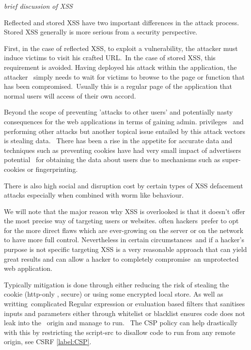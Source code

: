 \documentclass[a4paper,12pt]{paper}
\begin{document}
\emph{brief discussion of XSS}

Reflected and stored XSS have two important differences in the attack process. Stored XSS generally is more serious from a security perspective.

First, in the case of reflected XSS, to exploit a vulnerability, the attacker must induce victims to visit his crafted URL.\
In the case of stored XSS, this requirement is avoided. Having deployed his attack within the application, the attacker \
simply needs to wait for victims to browse to the page or function that has been compromised.\
Usually this is a regular page of the application that normal users will access of their own accord.\

Beyond the scope of preventing 'attacks to other users' and potentially nasty consequences for the web applications in terms of gaining admin. privileges \
and performing other attacks but another topical issue entailed by this attack vectors is stealing data. \
There has been a rise in the appetite for accurate data and techniques such as preventing cookies have had very small impact of advertisers potential \
for obtaining the data about users due to mechanisms such as super-cookies or fingerprinting. \

There is also high social and disruption cost by certain types of XSS defacement attacks especially when combined with worm like behaviour.\

We will note that the major reason why XSS is overlooked is that it doesn't offer the most precise way of targeting users or websites. often hackers\
prefer to opt for the more direct flaws which are ever-growing on the server or on the network to have more full control. Nevertheless in certain circumstances\
and if a hacker's purpose is not specific targeting XSS is a very reasonable approach that can yield great results and can allow a hacker to completely compromise\
an unprotected web application.\ 

Typically mitigation is done through either reducing the risk of stealing the cookie (http-only , secure) or using some encrypted local store. As well as writting\
complicated Regular expression or evaluation based filters that sanitises inputs and parameters either through whitelist or blacklist ensures code does not leak into the \
origin and manage to run. \
The CSP policy can help drastically with this by restricting the script-src to disallow code to run from any remote origin, see CSRF \ref{label:CSP}.\\
\end{document}
